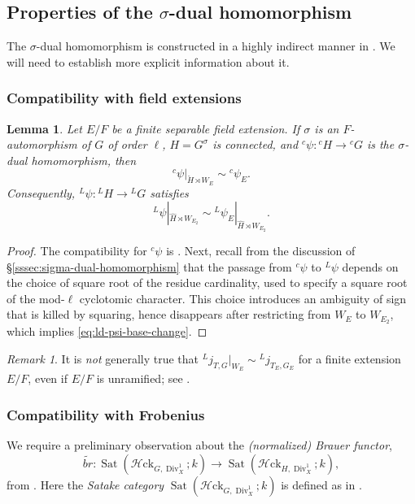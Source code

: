 \documentclass[reqno]{amsart}
\numberwithin{equation}{subsection}
\newcommand{\wt}[1]{\widetilde{#1}}
\newcommand{\wh}[1]{\widehat{#1}}
\newcommand{\co}{\colon}
\newcommand{\mrm}[1]{\mathrm{#1}}
\newcommand{\ld}{{}^L}
\newcommand{\lc}{{}^c}
\DeclareMathOperator{\Div}{Div}
\DeclareMathOperator{\Sat}{Sat}
\newcommand{\cHck}{\mathcal{H}\mrm{ck}}
\newcommand{\cbr}{br}
\newcommand{\chH}{\check{H}}
\newtheorem{lemma}[thm]{Lemma}
\theoremstyle{remark}
\newtheorem{remark}[thm]{Remark}
\numberwithin{equation}{subsection}
\numberwithin{figure}{subsection}
\begin{document}
\subsection{Properties of the $\sigma$-dual homomorphism} The $\sigma$-dual homomorphism is constructed in a highly indirect manner in \cite[\S 5.6]{F24}. We will need to establish more explicit information about it.

\subsubsection{Compatibility with field extensions}

\begin{lemma}\label{lemma:dual-hom-base-change}
Let $E/F$ be a finite separable field extension. If $\sigma$ is an $F$-automorphism of $G$ of order $\ell$, $H = G^\sigma$ is connected, and $\lc\psi\co \lc H \to \lc G$ is the $\sigma$-dual homomorphism, then
\begin{equation}\label{eq:lc-psi-base-change}
\lc\psi|_{\chH \rtimes W_E} \sim \lc\psi_E.
\end{equation}
Consequently, $\ld\psi\co \ld H \to \ld G$ satisfies
\begin{equation}\label{eq:ld-psi-base-change}
\ld\psi|_{\wh H \rtimes W_{E_2}} \sim \ld\psi_E|_{\wh H \rtimes W_{E_2}}.
\end{equation}

\end{lemma}

\begin{proof}The compatibility for $\lc \psi$ is \cite[Lemma 5.6.4]{F24}. Next, recall from the discussion of \S \ref{sssec:sigma-dual-homomorphism} that the passage from $\lc\psi$ to $\ld \psi$ depends on the choice of square root of the residue cardinality, used to specify a square root of the mod-$\ell$ cyclotomic character. This choice introduces an ambiguity of sign that is killed by squaring, hence disappears after restricting from $W_E$ to $W_{E_2}$, which implies \eqref{eq:ld-psi-base-change}.
\end{proof}

\begin{remark}
It is \textit{not} generally true that $\ld j_{T,G}|_{W_E}\sim\ld j_{T_E,G_E}$ for a finite extension $E/F$, even if $E/F$ is unramified; see \cite[Remark~5.2.3]{CF26a}.
\end{remark}

\subsubsection{Compatibility with Frobenius}\label{sssec:Brauer-for-trivial-action}
We require a preliminary observation about the \emph{(normalized) Brauer functor},
\[
\wt{\cbr} \co \Sat(\cHck_{G, \Div_X^1};k) \rightarrow \Sat(\cHck_{H, \Div_X^1};k),
\]
from \cite[\S\S5.3--5.5]{F24}. Here the \emph{Satake category} $\Sat(\cHck_{G, \Div_X^1};k)$ is defined as in \cite[Definition VI.7.8]{FS}.
\end{document}
